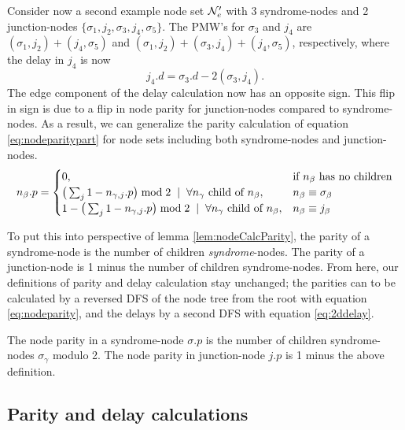 Consider now a second example node set $\mathcal{N}_e'$ with 3 syndrome-nodes and 2 junction-nodes $\{\sigma_1, j_2, \sigma_3, j_4, \sigma_5\}$. The PMW's for $\sigma_3$ and $j_4$ are $(\sigma_1, j_2) + (j_4, \sigma_5)$ and  $(\sigma_1, j_2) + (\sigma_3, j_4) + (j_4, \sigma_5)$, respectively, where the delay in $j_4$ is now
\begin{equation*}
  j_4.d = \sigma_3.d - 2(\sigma_3, j_4).
\end{equation*}
The edge component of the delay calculation now has an opposite sign. This flip in sign is due to a flip in node parity for junction-nodes compared to syndrome-nodes. As a result, we can generalize the parity calculation of equation \eqref{eq:nodeparitypart} for node sets including both syndrome-nodes and junction-nodes.
\begin{equation}\label{eq:nodeparity}
  n_\beta.p =
  \begin{cases}
    0, & \mbox{if $n_\beta$ has no children}  \\
    \big( \sum_{j} 1-n_{\gamma,j}.p \big ) \bmod 2 \hspace{.2cm} | \hspace{.2cm} \forall n_\gamma \mbox{ child of } n_\beta, & n_\beta \equiv \sigma_\beta \\
    1 - \big( \sum_{j} 1-n_{\gamma,j}.p \big ) \bmod 2 \hspace{.2cm} | \hspace{.2cm} \forall n_\gamma \mbox{ child of } n_\beta, & n_\beta \equiv j_\beta
  \end{cases}
\end{equation}

To put this into perspective of lemma \ref{lem:nodeCalcParity}, the parity of a syndrome-node is the number of children \emph{syndrome}-nodes. The parity of a junction-node is 1 minus the number of children syndrome-nodes. From here, our definitions of parity and delay calculation stay unchanged; the parities can to be calculated by a reversed DFS of the node tree from the root with equation \eqref{eq:nodeparity}, and the delays by a second DFS with equation \eqref{eq:2ddelay}.

\begin{lemma}\label{lem:nodecalc_junction}
  The node parity in a syndrome-node $\sigma.p$ is the number of children syndrome-nodes $\sigma_\gamma$ modulo 2. The node parity in junction-node $j.p$ is 1 minus the above definition.
\end{lemma}

\subsection{Parity and delay calculations}


